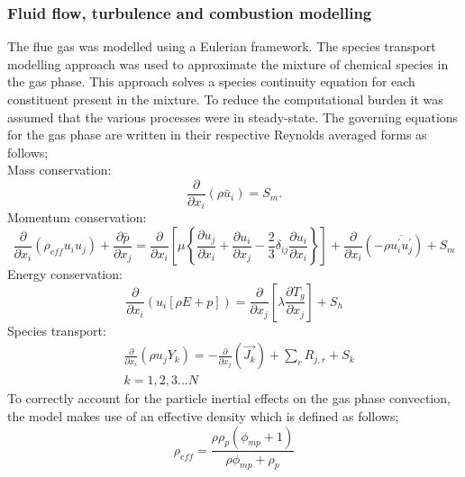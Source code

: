 \documentclass[review]{elsarticle}
\begin{document}
\subsubsection{Fluid flow, turbulence and combustion modelling}
The flue gas was modelled using a Eulerian framework. The species transport modelling approach was used to approximate the mixture of chemical species in the gas phase. This approach solves a species continuity equation for each constituent present in the mixture. To reduce the computational burden it was assumed that the various processes were in steady-state. The governing equations for the gas phase are written in their respective Reynolds averaged forms as follows;\\
Mass conservation:
\begin{equation}\label{eqn_RANS_mass}
\frac{\partial}{\partial x_{i}}(\rho \bar{u}_{i})=S_{m}.
\end{equation}
Momentum conservation:
\begin{equation}\label{eqn_momentum}
\frac{\partial}{\partial x_{i}}(\rho_{eff} u_{i}u_{j})+\frac{\partial \overline{p}}{\partial x_{j}}=\frac{\partial}{\partial x_{i}}\left[\mu\left\{\frac{\partial u_{j}}{\partial x_{i}}+\frac{\partial u_{i}}{\partial x_{j}}-\frac{2}{3}\delta_{ij}\frac{\partial u_{i}}{\partial x_{i}}\right\}\right]+\frac{\partial}{\partial x_{i}}(-\rho\overline{u_{i}^{'}u_{j}^{'}})+S_m
\end{equation}
Energy conservation:
\begin{equation}\label{eqn_energy}
\frac{\partial }{\partial x_{i}} (u_{i}[\rho E+p])=\frac{\partial }{\partial x_{j}}\left[\lambda\frac{\partial T_{g}}{\partial x_{j}}\right] +S_{h}
\end{equation}
Species transport:
\begin{equation}\label{eqn_species}
\begin{split}
&\frac{\partial}{\partial x_{i}}(\rho u_{j}Y_{k})=-\frac{\partial}{\partial x_{j}}(\vec{J_{k}})+ \sum_r R_{j,r} + S_{k}\\
&k = 1,2,3...N
\end{split}
\end{equation}
To correctly account for the particle inertial effects on the gas phase convection, the model makes use of an effective density which is defined as follows;
\begin{equation} \label{eqn_eff_rho}
	\rho_{eff} = \frac{\rho \rho_p \left( \phi_{mp} + 1 \right)}{\rho \phi_{mp} + \rho_p}
\end{equation}
\end{document}
